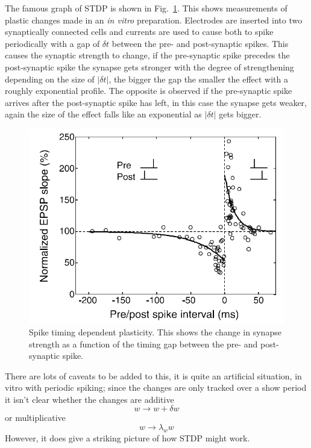\documentclass{article}
\begin{document}
The famous graph of STDP is shown in
Fig.~\ref{fig:BiPoo}. This shows measurements of plastic changes made
in an \textsl{in vitro} preparation. Electrodes are inserted into two
synaptically connected cells and currents are used to cause both to
spike periodically with a gap of $\delta t$ between the pre- and
post-synaptic spikes. This causes the synaptic strength to change, if
the pre-synaptic spike precedes the post-synaptic spike the synapse
gets stronger with the degree of strengthening depending on the size
of $|\delta t|$, the bigger the gap the smaller the effect with a
roughly exponential profile. The opposite is observed if the
pre-synaptic spike arrives after the post-synaptic spike has left, in
this case the synapse gets weaker, again the size of the effect falls
like an exponential as $|\delta t|$ gets bigger.


\begin{figure}
\begin{center}
\includegraphics[width=12cm]{DanPoo2004.jpg}
\end{center}
\caption{Spike timing dependent plasticity. This shows the change in
  synapse strength as a function of the timing gap between the pre-
  and post-synaptic spike. \label{fig:BiPoo}}
\end{figure}

There are lots of caveats to be added to this, it is quite an
artificial situation, in vitro with periodic spiking; since the
changes are only tracked over a show period it isn't clear whether the
changes are additive
\begin{equation}
w\rightarrow w+\delta w
\end{equation}
or multiplicative
\begin{equation}
w\rightarrow \lambda_w w
\end{equation}
However, it does give a striking picture of how STDP might work. 
\end{document}
